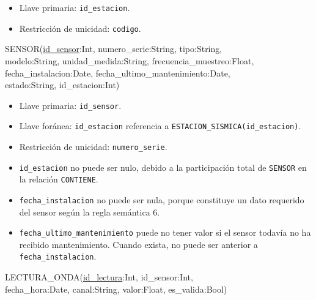 \documentclass[12pt,a4paper]{article}
\begin{document}
\begin{itemize}
    \item Llave primaria: \texttt{id\_\allowbreak{}estacion}.
    \item Restricción de unicidad: \texttt{codigo}.
\end{itemize}

\noindent
\begin{minipage}{\linewidth}
\small\ttfamily\raggedright
SENSOR(\underline{id\_sensor}:Int, numero\_serie:String, tipo:String,\\
modelo:String, unidad\_medida:String, frecuencia\_muestreo:Float,\\
fecha\_instalacion:Date, fecha\_ultimo\_mantenimiento:Date,\\
estado:String, id\_estacion:Int)
\end{minipage}
\par\medskip

\begin{itemize}
    \item Llave primaria: \texttt{id\_\allowbreak{}sensor}.
    \item Llave foránea: \texttt{id\_\allowbreak{}estacion} referencia a
    \texttt{ESTACION\_\allowbreak{}SISMICA(id\_\allowbreak{}estacion)}.
    \item Restricción de unicidad: \texttt{numero\_\allowbreak{}serie}.
    \item \texttt{id\_\allowbreak{}estacion} no puede ser nulo, debido a la participación total de \texttt{SENSOR} en la relación \texttt{CONTIENE}.
    \item \texttt{fecha\_\allowbreak{}instalacion} no puede ser nula, porque constituye un dato requerido del sensor según la regla semántica 6.
    \item \texttt{fecha\_\allowbreak{}ultimo\_\allowbreak{}mantenimiento} puede no tener valor si el sensor todavía no ha recibido mantenimiento. Cuando exista, no puede ser anterior a \texttt{fecha\_\allowbreak{}instalacion}.
\end{itemize}

\noindent
\begin{minipage}{\linewidth}
\small\ttfamily\raggedright
LECTURA\_ONDA(\underline{id\_lectura}:Int, id\_sensor:Int,\\
fecha\_hora:Date, canal:String, valor:Float, es\_valida:Bool)
\end{minipage}
\par\medskip
\end{document}
